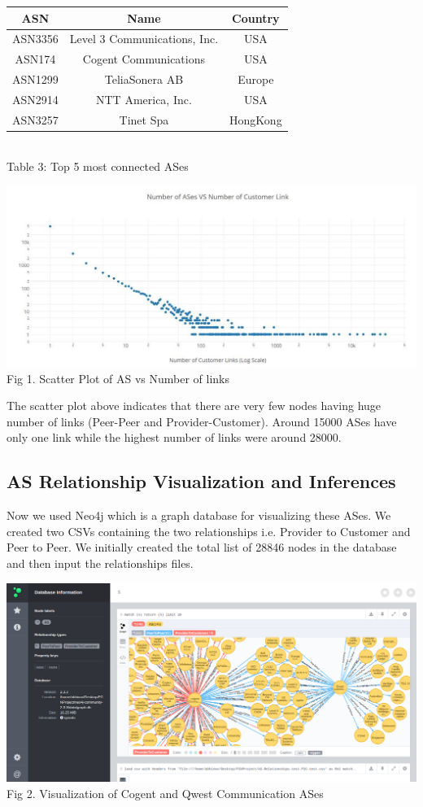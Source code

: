 \documentclass{sig-alternate-05-2015}
\begin{document}
\begin{center}
\begin{tabular}{ |c|c|c| } 
 \hline
ASN &  Name & Country \\
 \hline
ASN3356 &  Level 3 Communications, Inc. & USA \\
 \hline
ASN174 & Cogent Communications & USA \\
\hline
ASN1299 & TeliaSonera AB & Europe \\
\hline
ASN2914 & NTT America, Inc. & USA \\
\hline
ASN3257 & Tinet Spa & HongKong \\
\hline
\end{tabular}
\\Table 3: Top 5 most connected ASes\\
\end{center}
\begin{center}
\includegraphics[scale=0.2]{graph1}\\
Fig 1. Scatter Plot of AS vs Number of links\\
\end{center}
The scatter plot above indicates that there are very few nodes having huge number of links (Peer-Peer and Provider-Customer). Around 15000 ASes have only one link while the highest number of links were around 28000.
\subsection{AS Relationship Visualization and Inferences}
Now we used Neo4j which is a graph database for visualizing these ASes. We created two CSVs containing the two relationships i.e.
Provider to Customer and Peer to Peer. We initially created the total list of 28846 nodes in the database and then input the relationships files.
\begin{center}
\includegraphics[scale=0.18]{graph2}\\
Fig 2. Visualization of Cogent and Qwest Communication ASes\\
\end{center}
\end{document}
